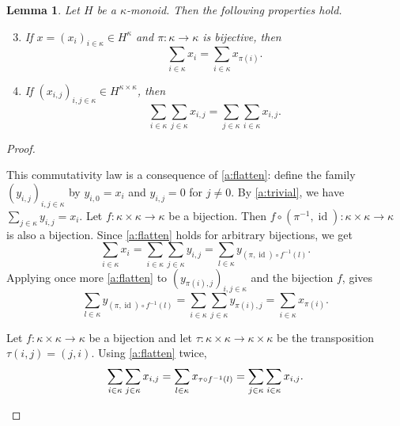 \documentclass[a4paper,11pt,oneside]{amsart}
\newtheorem{lemma}[teor]{Lemma}
\theoremstyle{remark}
\DeclareMathOperator{\id}{id}
\begin{document}
\begin{lemma} \label{l:kappa-basic}
  Let $H$ be a $\kappa$-monoid.
  Then the following properties hold.
  \begin{enumerate}[label=\textup{(A\arabic*)},leftmargin=1.2cm]
    \setcounter{enumi}{2}
  \item \label{a:commutative} If $x=(x_i)_{i \in \kappa} \in H^\kappa$ and $\pi \colon \kappa \to \kappa$ is bijective, then
    \[
      \sum_{i \in \kappa} x_i = \sum_{i \in \kappa} x_{\pi(i)}.
    \]
  \item \label{a:associative}
    If $(x_{i,j})_{i,j \in \kappa} \in H^{\kappa \times \kappa}$, then
    \[
      {\sum_{i \in \kappa}} {\sum_{j \in \kappa}} x_{i,j} = {\sum_{j \in \kappa}} {\sum_{i \in \kappa}} x_{i,j}.
    \]
  \end{enumerate}
\end{lemma}

\begin{proof}
  \begin{proofenumerate}
  \item[\ref{a:commutative}]
  This commutativity law is a consequence of \ref{a:flatten}:
  define the family $(y_{i,j})_{i,j \in \kappa}$ by $y_{i,0}=x_i$ and $y_{i,j}=0$ for $j \ne 0$.
  By \ref{a:trivial}, we have $\sum_{j \in \kappa} y_{i,j} = x_i$.
  Let $f\colon \kappa \times \kappa \to \kappa$ be a bijection.
  Then $f \circ (\pi^{-1},\id) \colon \kappa \times \kappa \to \kappa$ is also a bijection.
  Since \ref{a:flatten} holds for arbitrary bijections, we get
  \[
    \sum_{i \in \kappa} x_i = \sum_{i \in \kappa} \sum_{j \in \kappa} y_{i,j} =\sum_{l \in \kappa} y_{(\pi,\id) \circ f^{-1}(l)}.
  \]
  Applying once more \ref{a:flatten} to $(y_{\pi(i),j})_{i,j \in \kappa}$  and the bijection $f$, gives
  \[
    \sum_{l \in \kappa} y_{(\pi,\id) \circ f^{-1}(l)} = \sum_{i \in \kappa} \sum_{j \in \kappa} y_{\pi(i),j} = \sum_{i \in \kappa} x_{\pi(i)}.
  \]

  \item[\ref{a:associative}]
  Let $f \colon \kappa \times \kappa \to \kappa$ be a bijection and let $\tau\colon \kappa \times \kappa \to \kappa \times \kappa$ be the transposition $\tau(i,j)=(j,i)$.
  Using \ref{a:flatten} twice,
  \[
    \sum_{i \in \kappa} \sum_{j \in \kappa} x_{i,j} = \sum_{l \in \kappa} x_{\tau \circ f^{-1}(l)} = \sum_{j \in \kappa} \sum_{i \in \kappa} x_{i,j}. \qedhere
  \]
  \end{proofenumerate}
\end{proof}
\end{document}
